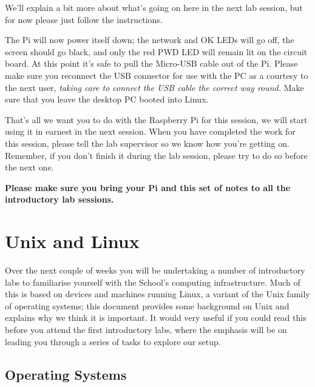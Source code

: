 \noindent We'll explain a bit more about what's going on here in the next lab session, but for now please just follow the instructions.


The  Pi will now power itself down; the network  and OK LEDs will go off, the screen should go black, and only the red PWD LED will remain lit on the circuit board. At this point it's safe to pull the Micro-USB cable out of the Pi. Please make sure you reconnect the USB connector for use with the PC  as a courtesy to the next user, \emph{taking care to connect the USB cable the correct way round. } Make sure that you leave the desktop PC booted into Linux.

That's all we want you to do with the Raspberry Pi for this session, we will start using it in earnest in the next session.  When you have completed the work for this session, please tell the lab supervisor so we know how you're getting on. Remember, if you don't finish it during the lab session, please try to do so before the next one.

\textbf{Please make sure you bring your Pi and this set of notes to all the introductory lab sessions.}

\cleardoublepage

\section{Unix and Linux}
\label{sec:unix-linux}


Over the next couple of weeks you will be undertaking a number of
introductory labs to familiarise yourself with the School's computing
infrastructure. Much of this is based on devices and machines running Linux, a
variant of the Unix family of operating systems; this document
provides some background on Unix and explains why we think it is
important. It would very useful if you could read this before you
attend the first introductory labs, where the emphasis will be on
leading you through a series of tasks to explore our setup.

\subsection{Operating Systems}

